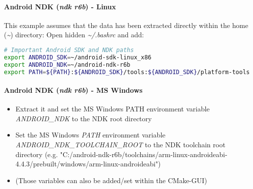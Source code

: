 \paragraph{Android \ac{NDK} (\emph{ndk r6b}) - Linux}
This example assumes that the data has been extracted directly within the home (\emph{\textasciitilde}) directory: Open hidden \emph{\textasciitilde /.bashrc} and add:
\begin{lstlisting}[language=sh]
# Important Android SDK and NDK paths
export ANDROID_SDK=~/android-sdk-linux_x86
export ANDROID_NDK=~/android-ndk-r6b
export PATH=${PATH}:${ANDROID_SDK}/tools:${ANDROID_SDK}/platform-tools:~/${ANDROID_NDK}
\end{lstlisting}


\paragraph{Android \ac{NDK} (\emph{ndk r6b}) - MS Windows}
\begin{itemize}
\item{Extract it and set the MS Windows PATH environment variable \emph{ANDROID\_NDK} to the \ac{NDK} root directory}
\item{Set the MS Windows \emph{PATH} environment variable \emph{ANDROID\_NDK\_TOOLCHAIN\_ROOT} to the \ac{NDK} toolchain root directory (e.g. "C:/android-ndk-r6b/toolchains/arm-linux-androideabi-4.4.3/prebuilt/windows/arm-linux-androideabi")}
\item{(Those variables can also be added/set within the CMake-\ac{GUI})}
\end{itemize}


